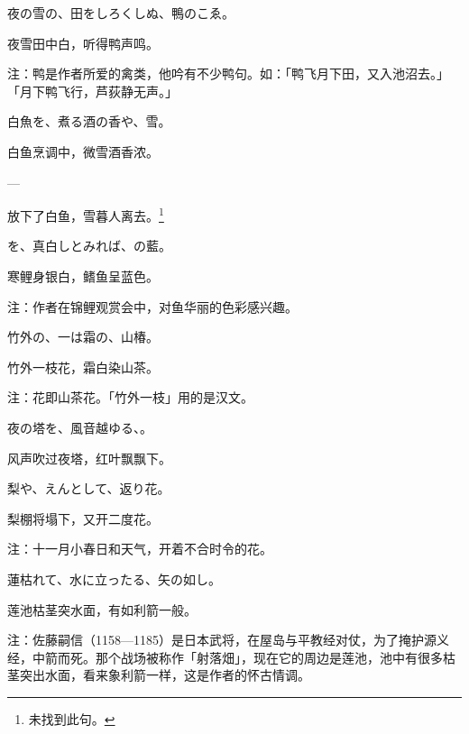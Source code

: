 \begin{haiku}
    {\FH 夜の雪の、田をしろくしぬ、鴨のこゑ。}

    {\FK 夜雪田中白，听得鸭声鸣。}

    {\FT 注：鸭是作者所爱的禽类，他吟有不少鸭句。如：「鸭飞月下田，又入池沼去。」 「月下鸭飞行，芦荻静无声。」}
\end{haiku}

\begin{haiku}
    {\FH 白魚を、煮る酒の香や、雪。}

    {\FK 白鱼烹调中，微雪酒香浓。}
\end{haiku}

\begin{haiku}
    {\FH ---}

    {\FK 放下了白鱼，雪暮人离去。\footnote{\FT 未找到此句。}}
\end{haiku}

\begin{haiku}
    {\FH {}を、真白しとみれば、の藍。}

    {\FK 寒鲤身银白，鳍鱼呈蓝色。}

    {\FT 注：作者在锦鲤观赏会中，对鱼华丽的色彩感兴趣。}
\end{haiku}

\begin{haiku}
    {\FH 竹外の、一は霜の、山椿。}

    {\FK 竹外一枝花，霜白染山茶。}

    {\FT 注：花即山茶花。「竹外一枝」用的是汉文。}
\end{haiku}

\begin{haiku}
    {\FH 夜の塔を、風音越ゆる、。}

    {\FK 风声吹过夜塔，红叶飘飘下。}
\end{haiku}

\begin{haiku}
    {\FH 梨や、えんとして、返り花。}

    {\FK 梨棚将塌下，又开二度花。}

    {\FT 注：十一月小春日和天气，开着不合时令的花。}
\end{haiku}

\begin{haiku}
    {\FH 蓮枯れて、水に立ったる、矢の如し。}

    {\FK 莲池枯茎突水面，有如利箭一般。}

    {\FT 注：佐藤嗣信（1158—1185）是日本武将，在屋岛与平教经对仗，为了掩护源义经，中箭而死。那个战场被称作「射落畑」，现在它的周边是莲池，池中有很多枯茎突出水面，看来象利箭一样，这是作者的怀古情调。}
\end{haiku}

